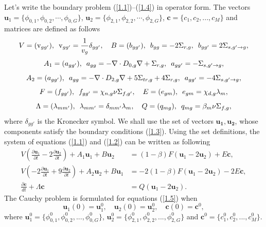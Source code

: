 \documentclass[a4paper]{jpconf}
\begin{document}
Let's write the boundary problem (\ref{1.1})--(\ref{1.4}) in operator form. 
The vectors $\bm u_1 = \{\phi_{0,1}, \phi_{0,2}, \cdots, \phi_{0,G}\}$, $\bm u_2 = \{\phi_{2,1}, \phi_{2,2}, \cdots, \phi_{2,G}\}$, $\bm c = \{c_1, c_2, ..., c_M\}$ and matrices are defined as follows
\[
V = (\mathrm{v}_{gg'}),
\enskip
\mathrm{v}_{gg'} = \frac{1}{v_g} \delta_{gg'},
\quad
B = (b_{gg'}),
\enskip
b_{gg} = -2\Sigma_{r,g},
\enskip
b_{gg'} = 2\Sigma_{s, g' \rightarrow g},
\]
\[
A_1 = (a_{gg'}),
\enskip
a_{gg} = -\nabla \cdot D_{0,g} \nabla + \Sigma_{r,g},
\enskip
a_{gg'} = -\Sigma_{s, g' \rightarrow g},
\]
\[
A_2 = (a_{gg'}),
\enskip
a_{gg} = -\nabla \cdot D_{2,g} \nabla + 5\Sigma_{tr,g} + 4\Sigma_{r,g},
\enskip
a_{gg'} = -4\Sigma_{s, g' \rightarrow g},
\]
\[
F = (f_{gg'}),
\enskip
f_{gg'} = \chi_{n,g}\nu\Sigma_{f,g'},
\quad
E =(e_{gm}),
\enskip
e_{gm} = \chi_{d,g}\lambda_m,
\]
\[
\Lambda = (\lambda_{mm'}), 
\enskip
\lambda_{mm'} = \delta_{mm'}\lambda_m,
\quad
Q = (q_{mg}),
\enskip
q_{mg} =\beta_m \nu\Sigma_{f,g},
\]
where
$\delta_{g g'}$ is the Kronecker symbol.
We shall use the set of vectors $\bm {u_1, u_2}$, whose components satisfy the boundary conditions (\ref{1.3}). 
Using the set definitions, the system of equations (\ref{1.1}) and (\ref{1.2}) can be written as following
\begin{equation}\label{1.5}
\begin{split}
V (\frac{\partial \bm u_1}{\partial t} - 2 \frac{\partial \bm u_2}{\partial t}) + A_1 \bm u_1 + B \bm u_2 &=(1-\beta) F (\bm u_1 - 2\bm u_2) + E\bm c,
\\
V(- 2 \frac{\partial \bm u_1}{\partial t} + 9 \frac{\partial \bm u_2}{\partial t} ) + A_2 \bm u_2 + B \bm u_1 &=-2(1-\beta) F (\bm u_1 - 2\bm u_2) - 2E\bm c,
\\
\frac{\partial \bm c}{d t} + \Lambda \bm c &= Q (\bm u_1 - 2\bm u_2). 
\end{split}
\end{equation}
The Cauchy problem is formulated for equations (\ref{1.5}) when
\begin{equation}\label{1.7}
 \bm u_1(0) = \bm u_1^0, \quad  \bm u_2(0) = \bm u_2^0, \quad \bm c(0) = \bm c^0,
\end{equation} 
where $\bm u_1^0 = \{\phi_{0,1}^0,  \phi_{0,2}^0, ...,  \phi_{0,G}^0 \}$, 
$\bm u_2^0 = \{\phi_{2,1}^0,  \phi_{2,2}^0, ...,  \phi_{2,G}^0 \}$ and 
$\bm c^0 = \{ c_1^0,  c_2^0, ...,  c_M^0 \}$.
\end{document}
